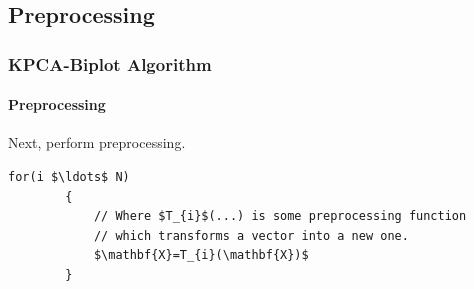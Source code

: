 \documentclass[serif]{beamer}
\begin{document}
	\subsection{Preprocessing}
	
	\begin{frame}[fragile,t]
		\frametitle{KPCA-Biplot Algorithm}
		\framesubtitle{Preprocessing}
		Next, perform preprocessing. \newline

		\begin{lstlisting}[mathescape]
		for(i $\ldots$ N)
		{
		    // Where $T_{i}$(...) is some preprocessing function
		    // which transforms a vector into a new one.	
		    $\mathbf{X}=T_{i}(\mathbf{X})$
		}
		\end{lstlisting}	
		
		\note
		{

		}
	\end{frame}
\end{document}
